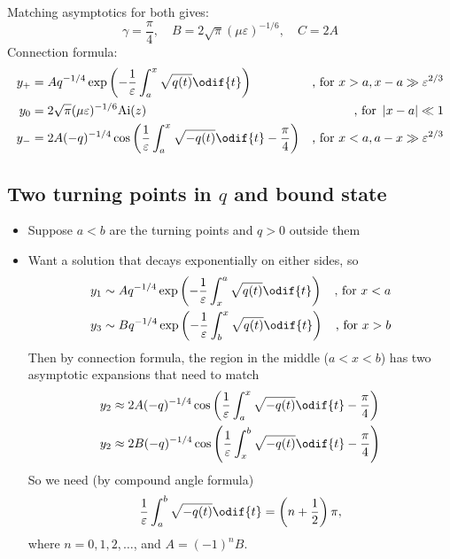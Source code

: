 \begin{itemize}
Matching asymptotics for both gives:
\[    \gamma = \frac{\pi}{4}, \quad  B = 2\sqrt{\pi} (\mu\varepsilon)^{-1/6}, \quad  C = 2A\]
Connection formula:
\begin{align*}
    y_+ &= Aq^{-1/4} \exp\left(-\frac{1}{\varepsilon} \int_a^x \sqrt{q(t)} \odif{t} \right)
    &\text{, for } x>a, x-a \gg \varepsilon^{2/3} \\
    y_0 &= 2\sqrt{\pi} (\mu\varepsilon)^{-1/6} \text{Ai}(z) 
    &\text{, for } \abs{x-a} \ll 1\\
    y_- &= 2A(-q)^{-1/4} \cos\left(\frac{1}{\varepsilon} \int_a^x \sqrt{-q(t)} \odif{t} - \frac{\pi}{4} \right)  
    &\text{, for } x<a, a-x \gg \varepsilon^{2/3} 
\end{align*}
\end{itemize}
\subsection*{Two turning points in $q$ and bound state}
\begin{itemize}
    \item Suppose $a<b$ are the turning points and $q>0$ outside them
    \item Want a solution that decays exponentially on either sides, so 
    \begin{align*}
    y_1 &\sim Aq^{-1/4} \exp\left(-\frac{1}{\varepsilon} \int_x^a \sqrt{q(t)} \odif{t} \right) 
    &\text{, for } x<a \\
    y_3 &\sim Bq^{-1/4} \exp\left(-\frac{1}{\varepsilon} \int_b^x \sqrt{q(t)} \odif{t} \right) 
    &\text{, for } x>b \\
    \end{align*} 
    Then by connection formula, the region in the middle ($a<x<b$) has two asymptotic expansions that need to match
    \begin{align*}
        y_2 &\approx 2A(-q)^{-1/4} \cos\left(\frac{1}{\varepsilon} \int_a^x \sqrt{-q(t)} \odif{t} - \frac{\pi}{4} \right)  \\
        y_2 &\approx 2B(-q)^{-1/4} \cos\left(\frac{1}{\varepsilon} \int_x^b \sqrt{-q(t)} \odif{t} - \frac{\pi}{4} \right)  
    \end{align*}
    So we need (by compound angle formula)
    \[\frac{1}{\varepsilon} \int_a^b \sqrt{-q(t)} \odif{t} = \left(n+\frac{1}{2}\right)\pi,\] 
    where $n = 0,1,2,\dots$, and $A=(-1)^nB$.
\end{itemize}
